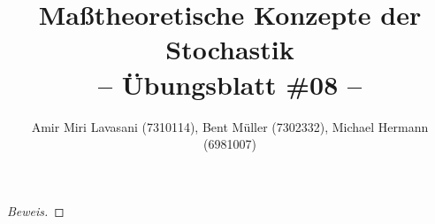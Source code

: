 \documentclass[10pt]{article}
\newenvironment{Aufgabe}[2][Aufgabe]{\begin{trivlist}
\item[\hskip \labelsep {\bfseries #1}\hskip \labelsep {\bfseries #2.}]}{\end{trivlist}}
\begin{document}
 
\title{ \textbf{Maßtheoretische Konzepte der Stochastik \\ -- Übungsblatt \#08 --} }

\author{Amir Miri Lavasani (7310114), Bent Müller (7302332),
        Michael Hermann (6981007)}
\maketitle

\begin{Aufgabe}{1} %
\end{Aufgabe}

\begin{proof}[Beweis]

\end{proof}
\end{document}

